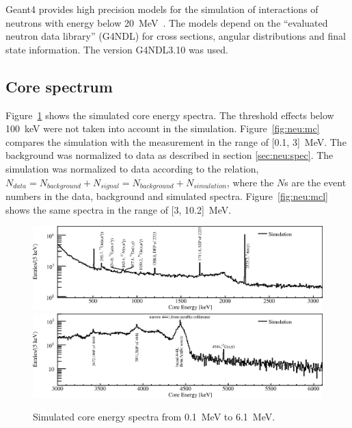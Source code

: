 Geant4 provides high precision models for the simulation of interactions of neutrons with energy below 20~MeV~\cite{Gea03,Gea06}. The models depend on the ``evaluated neutron data library'' (G4NDL) for cross sections, angular distributions and final state information. The version G4NDL3.10 was used.

\subsection{Core spectrum}
\label{sec:neu:spemc}
Figure~\ref{fig:neu:mca} shows the simulated core energy spectra. The threshold effects below 100~keV were not taken into account in the simulation. Figure~\ref{fig:neu:mc} compares the simulation with the measurement in the range of [0.1, 3]~MeV. The background was normalized to data as described in section \ref{sec:neu:spec}. The simulation was normalized to data according to the relation, $N_{data} = N_{background} + N_{signal} = N_{background} + N_{simulation}$, where the $N$s are the event numbers in the data, background and simulated spectra. Figure~\ref{fig:neu:mcl} shows the same spectra in the range of [3, 10.2]~MeV.

\begin{figure}[tbhp]
  \centering
  \includegraphics[width=\textwidth,clip]{spectra_mc1}
  \includegraphics[width=\textwidth,clip]{spectra_mc2}
  \caption{Simulated core energy spectra from 0.1~MeV to 6.1~MeV.}
  \label{fig:neu:mca}
\end{figure}

